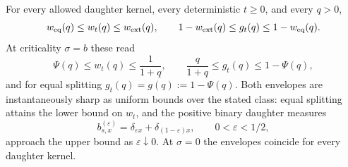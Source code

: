 \begin{theorem}
\label{thm:daughter-envelopes}
For every allowed daughter kernel, every deterministic $t\geq0$,
and every $q>0$,
\begin{equation}
 w_{\rm eq}(q)\leq w_t(q)\leq w_{\rm ext}(q),\qquad
 1-w_{\rm ext}(q)\leq g_t(q)\leq1-w_{\rm eq}(q).
 \label{eq:daughter-envelopes}
\end{equation}
At criticality $\sigma=b$ these read
\begin{equation}
 \Psi(q)\leq w_t(q)\leq\frac1{1+q},\qquad
 \frac q{1+q}\leq g_t(q)\leq1-\Psi(q),
 \label{eq:critical-envelopes}
\end{equation}
and for equal splitting $g_t(q)=g(q):=1-\Psi(q)$. Both envelopes are
instantaneously sharp as uniform bounds over the stated class: equal
splitting attains the lower bound on $w_t$, and the positive binary
daughter measures
\begin{equation}
 b^{(\varepsilon)}_{s,x}
       =\delta_{\varepsilon x}+\delta_{(1-\varepsilon)x},
       \qquad 0<\varepsilon<1/2,
 \label{eq:epsilon-daughters}
\end{equation}
approach the upper bound as $\varepsilon\downarrow0$. At $\sigma=0$
the envelopes coincide for every daughter kernel.
\end{theorem}

